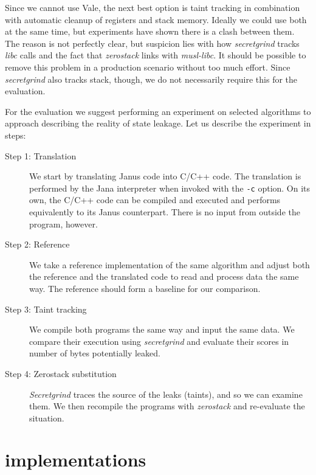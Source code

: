 \documentclass[a4paper,10pt,openright]{memoir}
\newcommand{\term}[1]{\textit{#1}}
\newcommand{\code}[1]{\texttt{#1}}
\begin{document}
Since we cannot use Vale, the next best option is taint tracking in 
combination with automatic cleanup of registers and stack memory. 
Ideally we could use both at the same time, but experiments have shown 
there is a clash between them. The reason is not perfectly clear, but 
suspicion lies with how \term{secretgrind} tracks \term{libc} calls and 
the fact that \term{zerostack} links with \term{musl-libc}. It should 
be possible to remove this problem in a production scenario without too 
much effort. Since \term{secretgrind} also tracks stack, though, we do 
not necessarily require this for the evaluation.

For the evaluation we suggest performing an experiment on selected 
algorithms to approach describing the reality of state leakage. Let us 
describe the experiment in steps:

\begin{description}

\item[Step 1: Translation] We start by translating Janus code into 
C/C++ code. The translation is performed by the Jana interpreter when 
invoked with the \code{-c} option. On its own, the C/C++ code can be 
compiled and executed and performs equivalently to its Janus 
counterpart. There is no input from outside the program, however.

\item[Step 2: Reference] We take a reference implementation of the same 
algorithm and adjust both the reference and the translated code to read 
and process data the same way. The reference should form a baseline for 
our comparison.

\item[Step 3: Taint tracking] We compile both programs the same way and 
input the same data. We compare their execution using 
\term{secretgrind} and evaluate their scores in number of bytes 
potentially leaked.

\item[Step 4: Zerostack substitution] \term{Secretgrind} traces the 
source of the leaks (taints), and so we can examine them. We then 
recompile the programs with \term{zerostack} and re-evaluate the 
situation.

\end{description}

\section{implementations}
\end{document}
